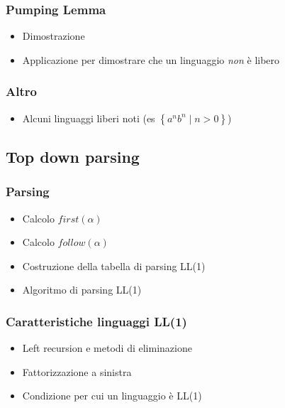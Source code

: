 \subsubsection{Pumping Lemma}
\begin{itemize}
	\item Dimostrazione
	\item Applicazione per dimostrare che un linguaggio \textit{non} è libero
\end{itemize}
\subsubsection{Altro}
\begin{itemize}
	\item Alcuni linguaggi liberi noti (es $ \left\{a^{n}b^{n} \mid n > 0\right\} $)
\end{itemize}

\subsection{Top down parsing}
\subsubsection*{Parsing}
\begin{itemize}
	\item Calcolo $ first\left(\alpha \right) $
	\item Calcolo $ follow\left(\alpha \right) $
	\item Costruzione della tabella di parsing LL(1)
	\item Algoritmo di parsing LL(1)
\end{itemize}

\subsubsection*{Caratteristiche linguaggi LL(1)}
\begin{itemize}
	\item Left recursion e metodi di eliminazione
	\item Fattorizzazione a sinistra
	\item Condizione per cui un linguaggio è LL(1)
\end{itemize}

